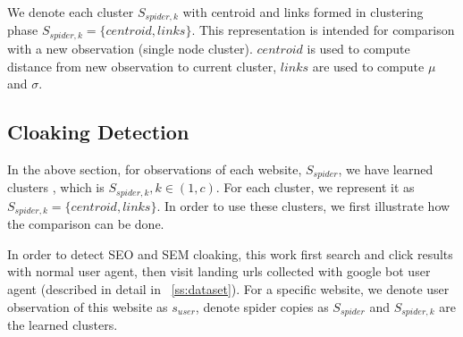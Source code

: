 We denote each cluster $S_{spider, k}$ with centroid and links formed in
clustering phase $S_{spider, k} = \{centroid, links\}$. This representation is
intended for comparison with a new observation (single node cluster). $centroid$ is used to
compute distance from new observation to current cluster, $links$ are used
to compute $\mu$ and $\sigma$.

%



%
%
%


%

\subsection{Cloaking Detection}
In the above section, for observations of each website, $S_{spider}$, we have 
learned clusters , which is $S_{spider, k}, k \in (1, c)$. For each cluster, we
represent it as $S_{spider, k} = \{centroid, links\}$.
In order to use these clusters, we first illustrate how the comparison can be
done.

In order to detect SEO and SEM cloaking,
this work first search and click results with normal user agent, then visit 
landing urls collected with google bot user agent (described in detail in
~\autoref{ss:dataset}).
For a specific website, we denote user observation of this website as
$s_{user}$, denote spider copies as $S_{spider}$ and 
$S_{spider, k}$ are the learned clusters.

